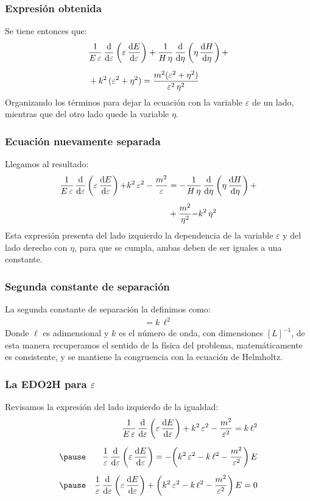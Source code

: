 \documentclass[12pt]{beamer}
\begin{document}
\begin{frame}
\frametitle{Expresión obtenida}
Se tiene entonces que:
\pause
\begin{align*}
&\dfrac{1}{E \, \varepsilon} \, \dv{\varepsilon} \left( \varepsilon \, \dv{E}{\varepsilon} \right) + 
\dfrac{1}{H \, \eta} \, \dv{\eta} \left( \eta \, \dv{H}{\eta} \right) + \\[0.5em]
&+ k^{2} \, (\varepsilon^{2} + \eta^{2}) = \dfrac{m^{2} (\varepsilon^{2} + \eta^{2})}{\varepsilon^{2} \, \eta^{2}}
\end{align*}
\pause
Organizando los términos para dejar la ecuación con la variable $\varepsilon$ de un lado, mientras que del otro lado quede la variable $\eta$.
\end{frame}
\begin{frame}
\frametitle{Ecuación nuevamente separada}
Llegamos al resultado:
\pause
\begin{align*}
\dfrac{1}{E \, \varepsilon} \, \dv{\varepsilon} \left( \varepsilon \, \dv{E}{\varepsilon} \right) {+} k^{2} \, \varepsilon^{2} - \dfrac{m^{2}}{\varepsilon} &= 
- \dfrac{1}{H \, \eta} \, \dv{\eta} \left( \eta \, \dv{H}{\eta} \right) + \\[0.5em]
&+ \dfrac{m^{2}}{\eta^{2}} {-} k^{2} \, \eta^{2}
\end{align*}
\pause
Esta expresión presenta del lado izquierdo la dependencia de la variable $\varepsilon$ y del lado derecho con $\eta$, \pause para que se cumpla, ambas deben de ser iguales a una constante.
\end{frame}
\begin{frame}
\frametitle{Segunda constante de separación}
La segunda constante de separación la definimos como:
\pause
\begin{align*}
= k \, \ell^{2}
\end{align*}
\pause
Donde $\ell$ es adimensional y $k$ es el número de onda, con dimensiones $[L]^{-1}$, \pause de esta manera recuperamos el sentido de la física del problema, matemáticamente es consistente, y se mantiene la congruencia con la ecuación de Helmholtz.
\end{frame}
\begin{frame}
\frametitle{La EDO2H para $\varepsilon$}
Revisamos la expresión del lado izquierdo de la igualdad:
\pause
\begin{eqnarray*}
&{}&\dfrac{1}{E \, \varepsilon} \, \dv{\varepsilon} \left( \varepsilon \, \dv{E}{\varepsilon} \right) + k^{2} \, \varepsilon^{2} - \dfrac{m^{2}}{\varepsilon^{2}} = k \, \ell^{2} \\[0.5em] \pause
&{}&\dfrac{1}{\varepsilon} \, \dv{\varepsilon} \left( \varepsilon \, \dv{E}{\varepsilon} \right) = - \bigg( k^{2} \, \varepsilon^{2} - k \, \ell^{2} - \dfrac{m^{2}}{\varepsilon^{2}} \bigg) \, E \\[0.5em] \pause
&{}&\dfrac{1}{\varepsilon} \, \dv{\varepsilon} \left( \varepsilon \, \dv{E}{\varepsilon} \right) + \bigg( k^{2} \, \varepsilon^{2} - k \, \ell^{2} - \dfrac{m^{2}}{\varepsilon^{2}} \bigg) \, E = 0
\end{eqnarray*}
\end{frame}
\end{document}
